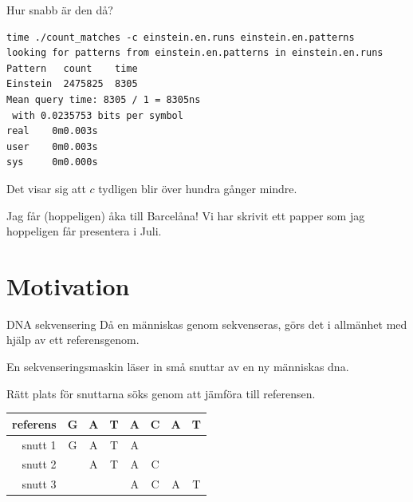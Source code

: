 \documentclass[11pt, aspectratio=169, table]{beamer}
\begin{document}
\begin{frame}[fragile]{Hur snabb är den då?}
\begin{verbatim}
time ./count_matches -c einstein.en.runs einstein.en.patterns
looking for patterns from einstein.en.patterns in einstein.en.runs
Pattern   count    time
Einstein  2475825  8305
Mean query time: 8305 / 1 = 8305ns
 with 0.0235753 bits per symbol
real    0m0.003s
user    0m0.003s
sys     0m0.000s
\end{verbatim}

Det visar sig att $c$ tydligen blir över hundra gånger mindre.
\end{frame}

\begin{frame}{Jag får (hoppeligen) åka till Barcelåna!}
\setlength{\parskip}{\fill}
Vi har skrivit ett papper som jag hoppeligen får presentera i Juli.
\end{frame}

\section{Motivation}
\begin{frame}{DNA sekvensering}
\setlength{\parskip}{\fill}
Då en människas genom sekvenseras, görs det i allmänhet med hjälp av ett referensgenom.

En sekvenseringsmaskin läser in små snuttar av en ny människas dna.

Rätt plats för snuttarna söks genom att jämföra till referensen.

\begin{center}
\tt \begin{tabular}{r|ccccccc}
\sf referens & G & A & T & A & C & A & T\\
\hline
\sf snutt 1 & G & A & T & A\\
\sf snutt 2 &   & A & T & A & C\\
\sf snutt 3 &   &   &   & A & C & A & T
\end{tabular}
\end{center}
\end{frame}
\end{document}
